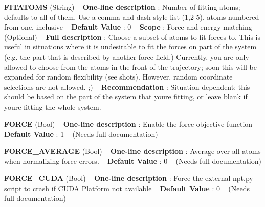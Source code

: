 \begin{DoxyItemize}
\item {\bfseries  F\+I\+T\+A\+T\+O\+MS } (String) ~\newline
{\bfseries  One-\/line description }\+: Number of fitting atoms; defaults to all of them. Use a comma and dash style list (1,2-\/5), atoms numbered from one, inclusive ~\newline
{\bfseries  Default Value }\+: 0 ~\newline
{\bfseries  Scope }\+: Force and energy matching (Optional) ~\newline
{\bfseries  Full description }\+: Choose a subset of atoms to fit forces to. This is useful in situations where it is undesirable to fit the forces on part of the system (e.\+g. the part that is described by another force field.) Currently, you are only allowed to choose from the atoms in the front of the trajectory; soon this will be expanded for random flexibility (see \textquotesingle{}shots\textquotesingle{}). However, random coordinate selections are not allowed. ;) ~\newline
{\bfseries  Recommendation }\+: Situation-\/dependent; this should be based on the part of the system that you\textquotesingle{}re fitting, or leave blank if you\textquotesingle{}re fitting the whole system.\end{DoxyItemize}
\begin{DoxyItemize}
\item {\bfseries  F\+O\+R\+CE } (Bool) ~\newline
{\bfseries  One-\/line description }\+: Enable the force objective function ~\newline
{\bfseries  Default Value }\+: 1 ~\newline
(Needs full documentation)\end{DoxyItemize}
\begin{DoxyItemize}
\item {\bfseries  F\+O\+R\+C\+E\+\_\+\+A\+V\+E\+R\+A\+GE } (Bool) ~\newline
{\bfseries  One-\/line description }\+: Average over all atoms when normalizing force errors. ~\newline
{\bfseries  Default Value }\+: 0 ~\newline
(Needs full documentation)\end{DoxyItemize}
\begin{DoxyItemize}
\item {\bfseries  F\+O\+R\+C\+E\+\_\+\+C\+U\+DA } (Bool) ~\newline
{\bfseries  One-\/line description }\+: Force the external npt.\+py script to crash if C\+U\+DA Platform not available ~\newline
{\bfseries  Default Value }\+: 0 ~\newline
(Needs full documentation)\end{DoxyItemize}

